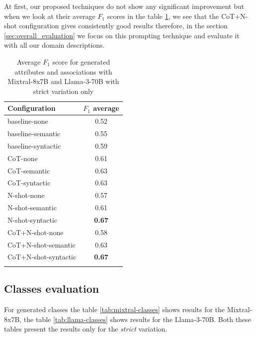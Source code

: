 At first, our proposed techniques do not show any significant improvement but when we look at their average $F_1$ scores in the table \ref{tab:F1_attributes_associations_average}, we see that the CoT+N-shot configuration gives consistently good results therefore, in the section \ref{sec:overall_evaluation} we focus on this prompting technique and evaluate it with all our domain descriptions.


\begin{table}[!h]
    \scriptsize
    \centering
    \setlength{\tabcolsep}{0.5em}
    \begin{tabular}{lc}
     \toprule
        Configuration & $F_1$ average \\
    \toprule
    
    \addlinespace
    baseline-none  & 0.52  \\
    baseline-semantic  & 0.55  \\
    baseline-syntactic  & 0.59  \\
    CoT-none	& 0.61  \\
    CoT-semantic & 0.63  \\
    CoT-syntactic & 0.63  \\
    N-shot-none & 0.57 \\
    N-shot-semantic & 0.61 \\
    N-shot-syntactic & \textbf{0.67} \\
    CoT+N-shot-none & 0.58 \\
    CoT+N-shot-semantic & 0.63 \\
    CoT+N-shot-syntactic & \textbf{0.67} \\
    \addlinespace
    \bottomrule
    \addlinespace
    \end{tabular}
    \caption{Average $F_1$ score for generated attributes and associations with Mixtral-8x7B and Llama-3-70B with strict variation only}
    \label{tab:F1_attributes_associations_average}
\end{table}


\subsection{Classes evaluation}

For generated classes the table \ref{tab:mixtral-classes} shows results for the Mixtral-8x7B, the table \ref{tab:llama-classes} shows results for the Llama-3-70B. Both these tables present the results only for the \emph{strict} variation.

